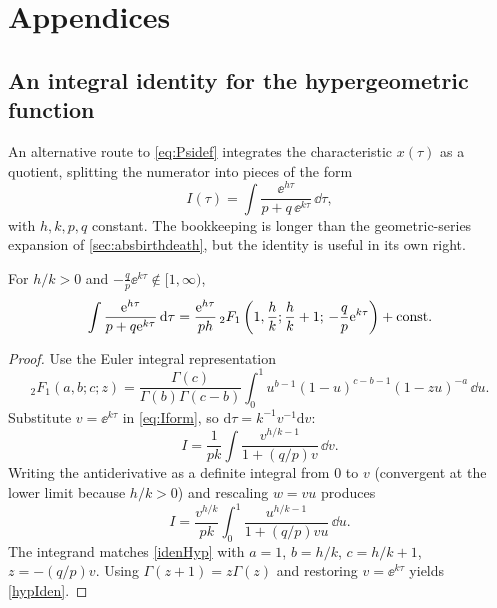 \appendix
\section*{Appendices}
\renewcommand{\thesubsection}{\Alph{subsection}}
\setcounter{subsection}{0}

\subsection{An integral identity for the hypergeometric function}
\label{app:hyp}

An alternative route to \cref{eq:Psidef} integrates the characteristic \(x(\tau)\) as a quotient, splitting the numerator into pieces of the form
\begin{equation}
\label{eq:Iform}
I(\tau) = \int\frac{\ee^{h\tau}}{p+q\,\ee^{k\tau}}\,\dd\tau ,
\end{equation}
with \(h,k,p,q\) constant. The bookkeeping is longer than the geometric-series expansion of \cref{sec:absbirthdeath}, but the identity is useful in its own right.

\begin{proposition}
\label{prop:hypIden}
For \(h/k>0\) and \(-\tfrac{q}{p}\ee^{k\tau}\notin[1,\infty)\),
\begin{equation}
\label{hypIden}
\int\frac{{\rm e}^{h\tau}}{p+q{\rm e}^{k\tau}}\,{\rm d}\tau
= \frac{{\rm e}^{h\tau}}{ph}\,{}_2F_1\left(1,\frac{h}{k};\frac{h}{k}+1;\,-\frac{q}{p}{\rm e}^{k\tau}\right) + \text{const}.
\end{equation}
\end{proposition}

\begin{proof}
Use the Euler integral representation
\begin{equation}
\label{idenHyp}
{}_2F_1(a,b;c;z) = \frac{\Gamma(c)}{\Gamma(b)\Gamma(c-b)}\int^1_0 u^{b-1}(1-u)^{c-b-1}(1-zu)^{-a}\,\dd u .
\end{equation}
Substitute \(v=\ee^{k\tau}\) in \cref{eq:Iform}, so \(\mathrm{d}\tau=k^{-1}v^{-1}\mathrm{d}v\):
\begin{equation*}
I = \frac{1}{pk}\int\frac{v^{h/k-1}}{1+(q/p)v}\,\dd v .
\end{equation*}
Writing the antiderivative as a definite integral from \(0\) to \(v\) (convergent at the lower limit because \(h/k>0\)) and rescaling \(w=vu\) produces
\begin{equation*}
I = \frac{v^{h/k}}{pk}\int_0^1\frac{u^{h/k-1}}{1+(q/p)vu}\,\dd u .
\end{equation*}
The integrand matches \cref{idenHyp} with \(a=1\), \(b=h/k\), \(c=h/k+1\), \(z=-(q/p)v\). Using \(\Gamma(z+1)=z\Gamma(z)\) and restoring \(v=\ee^{k\tau}\) yields \cref{hypIden}.
\end{proof}

